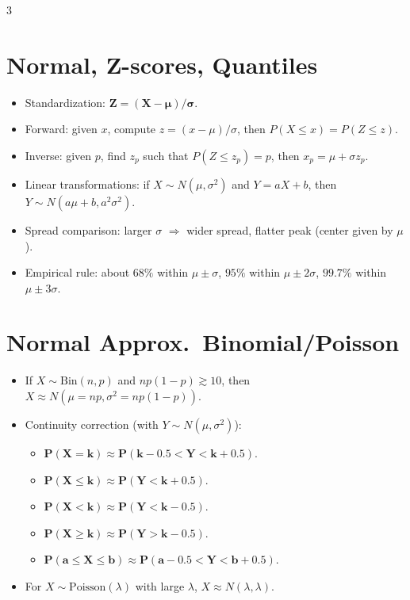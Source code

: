 \documentclass[11pt,landscape]{article}
\begin{document}
\begin{multicols}{3}
\section{Normal, Z-scores, Quantiles}
\begin{itemize}
  \item Standardization: $\mathbf{Z=(X-\mu)/\sigma}$.
  \item Forward: given $x$, compute $z=(x-\mu)/\sigma$, then $P(X\le x)=P(Z\le z)$.
  \item Inverse: given $p$, find $z_p$ such that $P(Z\le z_p)=p$, then $x_p=\mu+\sigma z_p$.
  \item Linear transformations: if $X\sim N(\mu,\sigma^2)$ and $Y=aX+b$, then $Y\sim N(a\mu+b,a^2\sigma^2)$.
  \item Spread comparison: larger $\sigma$ $\Rightarrow$ wider spread, flatter peak (center given by $\mu$).
  \item Empirical rule: about $68\%$ within $\mu\pm\sigma$, $95\%$ within $\mu\pm2\sigma$, $99.7\%$ within $\mu\pm3\sigma$.
\end{itemize}

\section{Normal Approx.\ Binomial/Poisson}
\begin{itemize}
  \item If $X\sim\text{Bin}(n,p)$ and $np(1-p)\gtrsim10$, then $X\approx N(\mu=np,\sigma^2=np(1-p))$.
  \item Continuity correction (with $Y\sim N(\mu,\sigma^2)$):
    \begin{itemize}
      \item $\mathbf{P(X=k)\approx P(k-0.5<Y<k+0.5)}$.
      \item $\mathbf{P(X\le k)\approx P(Y<k+0.5)}$.
      \item $\mathbf{P(X<k)\approx P(Y<k-0.5)}$.
      \item $\mathbf{P(X\ge k)\approx P(Y>k-0.5)}$.
      \item $\mathbf{P(a\le X\le b)\approx P(a-0.5<Y<b+0.5)}$.
    \end{itemize}
  \item For $X\sim\text{Poisson}(\lambda)$ with large $\lambda$, $X\approx N(\lambda,\lambda)$.
\end{itemize}


\end{multicols}
\end{document}
